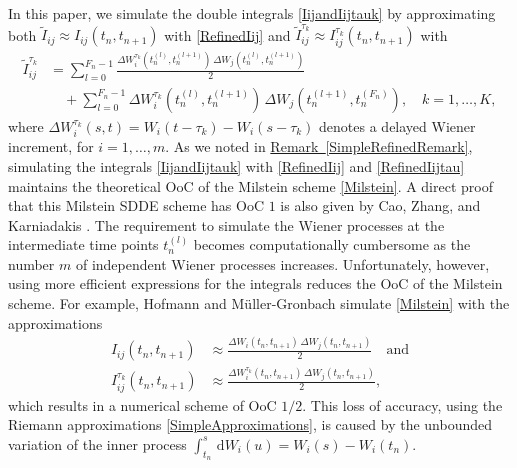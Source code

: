 \documentclass[onefignum]{siamart250211}
\begin{document}
In this paper, we simulate the double integrals \cref{IijandIijtauk} by approximating both $\tilde{I}_{ij}\approx I_{ij}(t_n,t_{n+1})$ with \cref{RefinedIij} and $\tilde{I}_{ij}^{\tau_k}\approx I_{ij}^{\tau_k}(t_n,t_{n+1})$ with
\begin{align}
\tilde{I}_{ij}^{\tau_k}  &= \sum_{l=0}^{F_n-1}\frac{\Delta W_i^{\tau_k}\left(t_n^{(l)},t_n^{(l+1)}\right)\,\Delta W_j\left(t_n^{(l)},t_n^{(l+1)}\right)}{2}\label{RefinedIijtau}\\
&\quad+\sum_{l=0}^{F_n-1}\Delta W_i^{\tau_k}\left(t_n^{(l)},t_n^{(l+1)}\right)\,\Delta W_j\left(t_n^{(l+1)},t_n^{(F_n)}\right),\quad k=1,\ldots,K,\nonumber
\end{align}
where $\Delta W_i^{\tau_k}(s,t)=W_i(t-\tau_k)-W_i(s-\tau_k)$ denotes a delayed Wiener increment, for $i=1,\ldots,m$. As we noted in \hyperref[SimpleRefinedRemark]{Remark~\ref*{SimpleRefinedRemark}}, simulating the integrals \cref{IijandIijtauk} with \cref{RefinedIij} and \cref{RefinedIijtau} maintains the theoretical OoC of the Milstein scheme \cref{Milstein}. A direct proof that this Milstein SDDE scheme has OoC $1$ is also given by Cao, Zhang, and Karniadakis \cite{CaoZhangKarniadakis2015}. The requirement to simulate the Wiener processes at the intermediate time points $t_n^{(l)}$ becomes computationally cumbersome as the number $m$ of independent Wiener processes increases. Unfortunately, however, using more efficient expressions for the integrals reduces the OoC of the Milstein scheme. For example, Hofmann and M\"uller-Gronbach \cite{Hofmann2006} simulate \cref{Milstein} with the approximations
\begin{align}I_{ij}(t_n,t_{n+1})&\approx\frac{\Delta W_i(t_n,t_{n+1})\,\Delta W_j(t_n,t_{n+1})}{2}\quad\textrm{and}\label{SimpleApproximations}\\
I_{ij}^{\tau_k}(t_n,t_{n+1})&\approx\frac{\Delta W_i^{\tau_k}(t_n,t_{n+1})\,\Delta W_j(t_n,t_{n+1})}{2},\nonumber\end{align}
which results in a numerical scheme of OoC $1/2$. This loss of accuracy, using the Riemann approximations \cref{SimpleApproximations}, is caused by the unbounded variation of the inner process $\int_{t_n}^s\,\mathrm{d}W_i(u)=W_i(s)-W_i(t_n)$.
\end{document}
